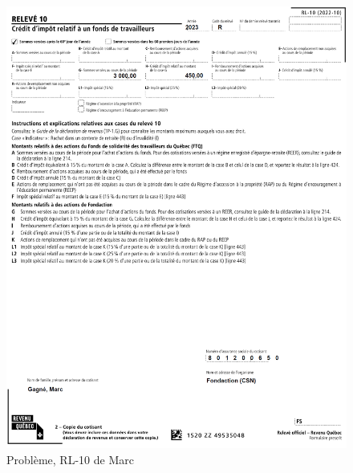 \begin{figure}
	\centering
	\includegraphics[width=.9\textwidth]{probleme/chapitre-6/Marc-RL10.png}
	\caption[]{Problème, RL-10 de Marc}
	\label{fig:chap6ProblemeMarcRL10}
\end{figure}

